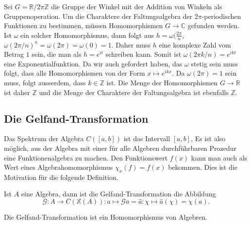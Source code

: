 \begin{beispiel}
\label{buch:gruppen:gelfand:bsp:winkel}
Sei $G= \mathbb{R}/2\pi\mathbb{Z}$ die Gruppe der Winkel mit der 
Addition von Winkeln als Gruppenoperation.
Um die Charaktere der Faltungsalgebra der $2\pi$-periodischen Funktionen
zu bestimmen, müssen Homomorphismen $G\to\mathbb{C}$ gefunden werden.
Ist $\omega$ ein solcher Homomorphismus, dann folgt aus
$h=\omega(\frac{2\pi}{n}$, $\omega(2\pi/n)^n = \omega(2\pi)=\omega(0)=1$.
Daher muss $h$ eine komplexe Zahl vom Betrag $1$ sein, die man als
$h=e^{it}$ schreiben kann.
Somit ist $\omega(2\pi k/n) = e^{ikt}$ eine Exponentialfunktion.
Da wir auch gefordert haben, das $\omega$ stetig sein muss folgt,
dass alle Homomorphismen von der Form $x\mapsto e^{ikx}$.
Da $\omega(2\pi)=1$ sein muss, folgt ausserdem, dass $k\in \mathbb{Z}$
ist.
Die Menge der Homomorphismen $G\to\mathbb{R}$ ist daher $\mathbb{Z}$ und
die Menge der Charaktere der Faltungsalgebra ist ebenfalls $\mathbb{Z}$.
\end{beispiel}


%
%
\subsection{Die Gelfand-Transformation}
Das Spektrum der Algebra $C([a,b])$ ist das Intervall $[a,b]$,
Es ist also möglich, aus der Algebra mit einer für alle Algebren
durchführbaren Prozedur eine Funktionenalgebra zu machen.
Den Funktionswert $f(x)$  kann man auch als Wert eines 
Algebrahomomorphismus $\chi_x(f) = f(x)$ bekommen.
Dies ist die Motivation für die folgende Definition.

\begin{definition}
Ist $A$ eine Algebra, dann ist die Gelfand-Transformation
die Abbildung
\[
\mathscr{G}
\colon
A \to C(\mathbb{X}(A))
:
a
\mapsto \mathscr{G}a = \hat{a}
\colon \chi \mapsto \hat{a}(\chi) = \chi(a).
\]
\end{definition}

\begin{satz}
Die Gelfand-Transformation ist ein Homomorphismus von Algebren.
\end{satz}

